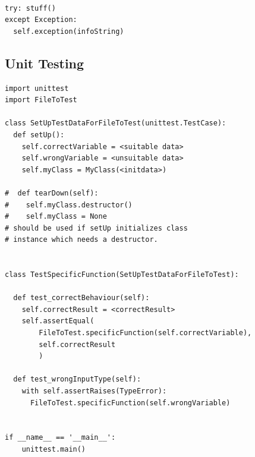 \documentclass[10pt,a4paper]{article}
\begin{document}
\begin{lstlisting}

try: stuff()
except Exception:
  self.exception(infoString)

\end{lstlisting}


\newpage
\subsection{Unit Testing}

\begin{lstlisting}
import unittest
import FileToTest 

class SetUpTestDataForFileToTest(unittest.TestCase):
  def setUp():
    self.correctVariable = <suitable data>
    self.wrongVariable = <unsuitable data>
    self.myClass = MyClass(<initdata>) 
    
#  def tearDown(self):  
#    self.myClass.destructor()  
#    self.myClass = None
# should be used if setUp initializes class  
# instance which needs a destructor.


class TestSpecificFunction(SetUpTestDataForFileToTest):

  def test_correctBehaviour(self):
    self.correctResult = <correctResult>
    self.assertEqual(
        FileToTest.specificFunction(self.correctVariable), 
        self.correctResult
        )

  def test_wrongInputType(self):
    with self.assertRaises(TypeError):
      FileToTest.specificFunction(self.wrongVariable)


if __name__ == '__main__':
    unittest.main()

\end{lstlisting}
\end{document}
